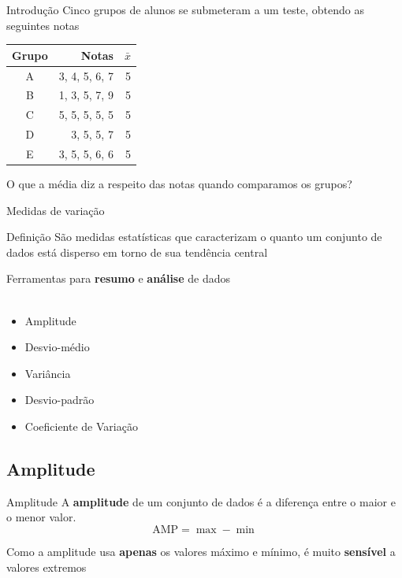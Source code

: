 \documentclass[10pt]{beamer}\usepackage[]{graphicx}\usepackage[]{color}
\theoremstyle{definition}
\begin{document}
\begin{frame}{Introdução}
  Cinco grupos de alunos se submeteram a um teste, obtendo as seguintes
  notas
  \begin{table}[htbp]
    \centering
    \begin{tabular}{crr}
      \hline
      \textbf{Grupo} & \textbf{Notas} & $\bar{x}$ \\ \hline
      A & 3, 4, 5, 6, 7 & 5 \\
      B & 1, 3, 5, 7, 9 & 5\\
      C & 5, 5, 5, 5, 5 & 5\\
      D & 3, 5, 5, 7 & 5\\
      E & 3, 5, 5, 6, 6 & 5\\
      \hline
    \end{tabular}
  \end{table}
  O que a média diz a respeito das notas quando comparamos os grupos?
\end{frame}

\begin{frame}{Medidas de variação}
  \begin{block}{Definição}
    São medidas estatísticas que caracterizam o quanto um conjunto de
    dados está disperso em torno de sua tendência central
  \end{block}
  \vspace{1em}
  Ferramentas para \textbf{resumo} e \textbf{análise} de dados\\~\\
  \begin{itemize}
  \item Amplitude
  \item Desvio-médio
  \item Variância
  \item Desvio-padrão
  \item Coeficiente de Variação
  \end{itemize}
\end{frame}

\subsection{Amplitude}

\begin{frame}{Amplitude}
  A \textbf{amplitude} de um conjunto de dados é a diferença entre o
  maior e o menor valor.
  \begin{equation*}
    \text{AMP} = \max - \min
  \end{equation*}
  \vspace{1em}

  Como a amplitude usa \textbf{apenas} os valores máximo e mínimo, é
  muito \textbf{sensível} a valores extremos \\~\\
\end{frame}
\end{document}
